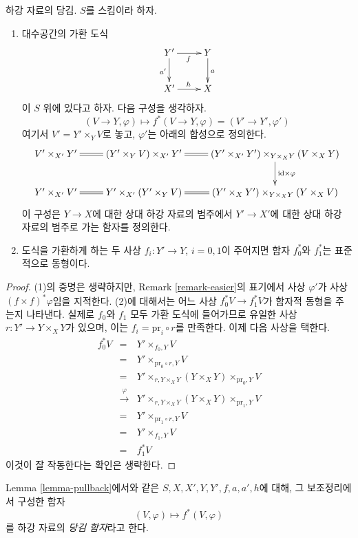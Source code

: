 \begin{lemma}
\label{lemma-pullback}
하강 자료의 당김. $S$를 스킴이라 하자.
\begin{enumerate}
\item 대수공간의 가환 도식
$$
\xymatrix{
Y' \ar[r]_f \ar[d]_{a'} & Y \ar[d]^a \\
X' \ar[r]^h & X
}
$$
이 $S$ 위에 있다고 하자. 다음 구성을 생각하자.
$$
(V \to Y, \varphi) \longmapsto f^*(V \to Y, \varphi) = (V' \to Y', \varphi')
$$
여기서 $V'=Y'\times_YV$로 놓고, $\varphi'$는 아래의 합성으로 정의한다.
$$
\xymatrix{
V' \times_{X'} Y' \ar@{=}[r] &
(Y' \times_Y V) \times_{X'} Y' \ar@{=}[r] &
(Y' \times_{X'} Y') \times_{Y \times_X Y} (V \times_X Y)
\ar[d]^{\text{id} \times \varphi} \\
Y' \times_{X'} V' \ar@{=}[r] &
Y' \times_{X'} (Y' \times_Y V) &
(Y' \times_X Y') \times_{Y \times_X Y} (Y \times_X V) \ar@{=}[l]
}
$$
이 구성은 $Y\to X$에 대한 상대 하강 자료의 범주에서 $Y'\to X'$에 대한
상대 하강 자료의 범주로 가는 함자를 정의한다.
\item 도식을 가환하게 하는 두 사상 $f_i:Y'\to Y$, $i=0,1$이 주어지면
함자 $f_0^*$와 $f_1^*$는 표준적으로 동형이다.
\end{enumerate}
\end{lemma}

\begin{proof}
(1)의 증명은 생략하지만, Remark \ref{remark-easier}의 표기에서 사상
$\varphi'$가 사상 $(f\times f)^*\varphi$임을 지적한다. (2)에 대해서는
어느 사상 $f_0^*V\to f_1^*V$가 함자적 동형을 주는지 나타낸다. 실제로
$f_0$와 $f_1$ 모두 가환 도식에 들어가므로 유일한 사상
$r:Y'\to Y\times_XY$가 있으며, 이는 $f_i=\text{pr}_i\circ r$를 만족한다. 이제 다음 사상을
택한다.
\begin{eqnarray*}
f_0^*V & = &
Y' \times_{f_0, Y} V \\
& = &
Y' \times_{\text{pr}_0 \circ r, Y} V \\
& = &
Y' \times_{r, Y \times_X Y} (Y \times_X Y) \times_{\text{pr}_0, Y} V \\
& \xrightarrow{\varphi} &
Y' \times_{r, Y \times_X Y} (Y \times_X Y) \times_{\text{pr}_1, Y} V \\
& = &
Y' \times_{\text{pr}_1 \circ r, Y} V \\
& = &
Y' \times_{f_1, Y} V \\
& = & f_1^*V
\end{eqnarray*}
이것이 잘 작동한다는 확인은 생략한다.
\end{proof}

\begin{definition}
\label{definition-pullback-functor}
Lemma \ref{lemma-pullback}에서와 같은 $S,X,X',Y,Y',f,a,a',h$에 대해,
그 보조정리에서 구성한 함자
$$
(V, \varphi) \longmapsto f^*(V, \varphi)
$$
를 하강 자료의 {\it 당김 함자}라고 한다.
\end{definition}


